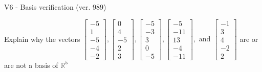 \begin{exercise}
  \begin{exerciseTitle}V6 - Basis verification (ver. 989)\end{exerciseTitle}
  \begin{exerciseStatement}
    Explain why the vectors \(\left[\begin{array}{r}
-5 \\
1 \\
-5 \\
-4 \\
-2
\end{array}\right] , \left[\begin{array}{r}
0 \\
4 \\
-5 \\
2 \\
3
\end{array}\right] , \left[\begin{array}{r}
-5 \\
-3 \\
3 \\
0 \\
-5
\end{array}\right] , \left[\begin{array}{r}
-5 \\
-11 \\
13 \\
-4 \\
-11
\end{array}\right] , \text{ and } \left[\begin{array}{r}
-1 \\
3 \\
4 \\
-2 \\
2
\end{array}\right]\) are or are not a basis of \(\mathbb{R}^5\)	



\end{exerciseStatement}
\end{exercise}
